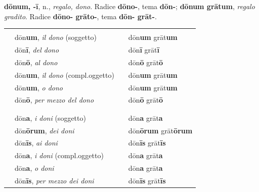 \documentclass[nols]{tufte-handout}
\newcommand{\nom}{\textsc{nom}\xspace}
\newcommand{\gen}{\textsc{gen}\xspace}
\newcommand{\dat}{\textsc{dat}\xspace}
\newcommand{\acc}{\textsc{acc}\xspace}
\newcommand{\voc}{\textsc{voc}\xspace}
\newcommand{\abl}{\textsc{abl}\xspace}
\newcommand{\textls}[2][5]{%
    \begingroup\addfontfeatures{LetterSpace=#1}#2\endgroup
  }
\renewcommand{\smallcapsspacing}[1]{\textls[10]{#1}}
\renewcommand{\textsc}[1]{\smallcapsspacing{\textsmallcaps{#1}}}
\begin{document}
 \textbf{dōnum, -ī}, n., \textit{regalo, dono}. Radice \textbf{dōno-}, tema \textbf{dōn-}; \textbf{dōnum grātum}, \textit{regalo gradito}. Radice \textbf{dōno- grāto-}, tema \textbf{dōn- grāt-}. 
\begin{fullwidth}
\begin{table}[!htbp]
  \centering
  \begin{tabular}{l l l l}
	& \multicolumn{3}{c}{\textsc{Singolare}} \\

    \nom & dōn\textbf{um}, \textit{il dono} (soggetto)    & \hspace{20mm} & dōn\textbf{um} grāt\textbf{um} \\
    \gen & dōn\textbf{ī}, \textit{del dono}   & \hspace{20mm} & dōn\textbf{ī} grāt\textbf{ī} \\
    \dat & dōn\textbf{ō}, \textit{al dono} & \hspace{20mm} & dōn\textbf{ō} grāt\textbf{ō} \\
    \acc & dōn\textbf{um}, \textit{il dono} (compl.oggetto)    & \hspace{20mm} & dōn\textbf{um} grāt\textbf{um} \\
    \voc & dōn\textbf{um}, \textit{o dono}   & \hspace{20mm} & dōn\textbf{um} grāt\textbf{um} \\
    \abl & dōn\textbf{ō}, \textit{per mezzo del dono} & \hspace{20mm} & dōn\textbf{ō} grāt\textbf{ō} \\
	
	\multicolumn{4}{c}{\textemdash} \\
	
	& \multicolumn{3}{c}{\textsc{Plurale}} \\

    \nom & dōn\textbf{a}, \textit{i doni} (soggetto)    & \hspace{20mm} & dōn\textbf{a} grāt\textbf{a} \\
    \gen & dōn\textbf{ōrum}, \textit{dei doni}   & \hspace{20mm} & dōn\textbf{ōrum} grāt\textbf{ōrum} \\
    \dat & dōn\textbf{īs}, \textit{ai doni} & \hspace{20mm} & dōn\textbf{īs} grāt\textbf{īs} \\
    \acc & dōn\textbf{a}, \textit{i doni} (compl.oggetto)    & \hspace{20mm} & dōn\textbf{a} grāt\textbf{a} \\
    \voc & dōn\textbf{a}, \textit{o doni}   & \hspace{20mm} & dōn\textbf{a} grāt\textbf{a} \\
    \abl & dōn\textbf{īs}, \textit{per mezzo dei doni} & \hspace{20mm} & dōn\textbf{īs} grāt\textbf{īs} \\
	

\end{tabular}
\end{table}
\end{fullwidth}
\end{document}
